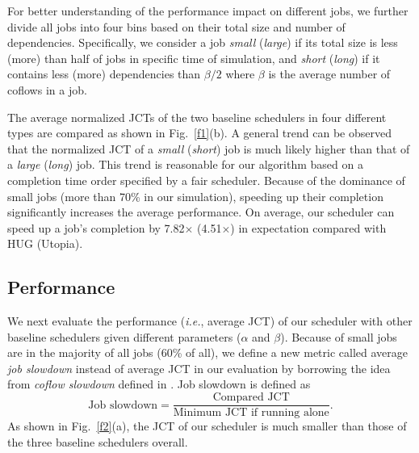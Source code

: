 \documentclass[10pt,journal,compsoc]{IEEEtran}
\begin{document}
For better understanding of the performance impact on different jobs, we further divide all jobs into four bins based on their total size and number of dependencies.
%
Specifically, we consider a job \emph{small} (\emph{large}) if its total size is less (more) than half of jobs in specific time of simulation,
%
and \emph{short} (\emph{long}) if it contains less (more) dependencies than $\beta/2$ where $\beta$ is the average number of coflows in a job.

The average normalized JCTs of the two baseline schedulers in four different types are compared as shown in Fig.~\ref{f1}(b).
%
A general trend can be observed that the normalized JCT of a \emph{small} (\emph{short}) job is much likely higher than that of a \emph{large} (\emph{long}) job.
%
This trend is reasonable for our algorithm based on a completion time order specified by a fair scheduler.
%
Because of the dominance of small jobs (more than 70\% in our simulation), speeding up their completion significantly increases the average performance.
%
On average, our scheduler can speed up a job's completion by 7.82$\times$ (4.51$\times$) in expectation compared with HUG (Utopia).

\subsection{Performance}
We next evaluate the performance (\emph{i.e.}, average JCT) of our scheduler with other baseline schedulers given different parameters ($\alpha$ and $\beta$).
%
Because of small jobs are in the majority of all jobs (60\% of all),
we define a new metric called average \emph{job slowdown} instead of average JCT in our evaluation by borrowing the idea from \emph{coflow slowdown} defined in \cite{utopia}.
%
Job slowdown is defined as
\[\text{Job slowdown} = \frac{\text{Compared JCT}}{\text{Minimum JCT if running alone}}.\]
%
As shown in Fig.~\ref{f2}(a), the JCT of our scheduler is much smaller than those of the three baseline schedulers overall.

\begin{figure*}[!t]
	\centering
	\hfil
	\hfil
	\caption{Characteristics of performance. (a) CDF of job slowdown. (b) Average job slowdown in different number of machines. (c) Average job slowdown in different average number of coflows in each job.}
	\label{f2}
\end{figure*}
\end{document}
